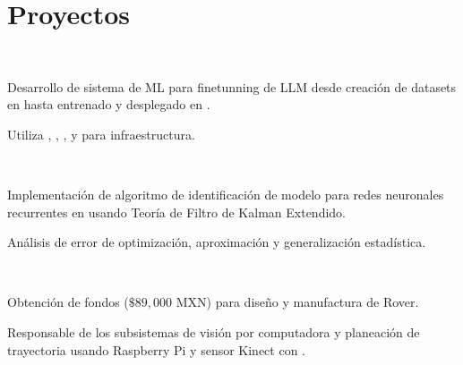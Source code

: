 \documentclass[]{tex/deedy-resume-openfont}
\begin{document}
\begin{minipage}[t]{0.66\textwidth}
\section{Proyectos}

\\
\begin{tightemize}
    \item Desarrollo de sistema de ML para finetunning de LLM desde creación de datasets en  hasta entrenado y desplegado en .
    \item Utiliza , , ,  y  para infraestructura.
\end{tightemize}
\sectionsep

\\
\begin{tightemize}
    \item Implementación de algoritmo de identificación de modelo para redes neuronales recurrentes en  usando Teoría de Filtro de Kalman Extendido.
    \item Análisis de error de optimización, aproximación y generalización estadística.
\end{tightemize}
\sectionsep

\\
\begin{tightemize}
    \item Obtención de fondos ($\$89,000$ MXN) para diseño y manufactura de Rover.
    \item Responsable de los subsistemas de visión por computadora y planeación de trayectoria usando Raspberry Pi y sensor Kinect con .
\end{tightemize}


\end{minipage} 
\end{document}
